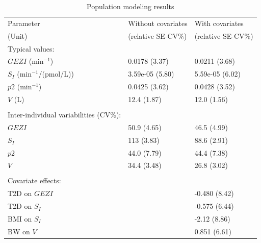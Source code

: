 \documentclass[utf8]{frontiersSCNS} %
\begin{document}
\begin{table}[h]
\caption{Population modeling results}
\label{tab:prm estimates}
\begin{tabular}{lll}
\hline
Parameter   & Without covariates & With covariates \\
(Unit)    & (relative SE-CV\%) & (relative SE-CV\%)\\ 
\hline
Typical values: \\
\hspace{.2cm} $GEZI$ (min$^{-1}$)                  & 0.0178 (3.37) & 0.0211 (3.68) \\
\hspace{.2cm} $S_I$ (min$^{-1}$/(pmol/L)) & 3.59e-05 (5.80)                          & 5.59e-05 (6.02)                        \\
\hspace{.2cm} $p2$ (min$^{-1}$)                    & 0.0425 (3.62) & 0.0428 (3.52) \\
\hspace{.2cm} $V$ (L)                         & 12.4 (1.87)   & 12.0 (1.56)   \\
                              &               &               \\
Inter-individual variabilities (CV\%): \\
\hspace{.2cm} $GEZI$                      & 50.9 (4.65)   & 46.5 (4.99)   \\
\hspace{.2cm} $S_I$                        & 113 (3.83)    & 88.6 (2.91)   \\
\hspace{.2cm} $p2$                        & 44.0 (7.79)   & 44.4 (7.38)   \\
\hspace{.2cm} $V$                         & 34.4 (3.48)   & 26.8 (3.02)   \\
                              &               &               \\
Covariate effects: &               &               \\
\hspace{.2cm} T2D on $GEZI$                  &               & -0.480 (8.42) \\
\hspace{.2cm} T2D on $S_I$                     &               & -0.575 (6.44) \\
\hspace{.2cm} BMI on $S_I$                     &               & -2.12 (8.86)  \\
\hspace{.2cm} BW on $V$                       &               & 0.851 (6.61)  \\ 


\end{tabular}
\end{table}
\end{document}
